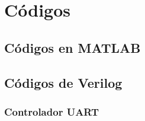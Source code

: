 \chapter{Códigos}

    \section{Códigos en MATLAB}

     

	\section{Códigos de Verilog}
	
	  \subsection{Controlador UART}
	
	\newpage
    

